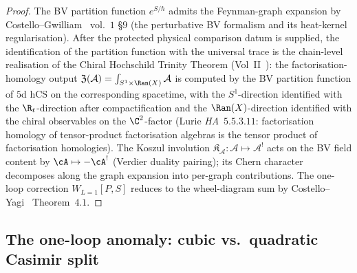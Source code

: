 \begin{proof}
The BV partition function $e^{S/\hbar}$ admits the Feynman-graph
expansion by Costello--Gwilliam~\cite{CostelloGwilliam} vol.~$1$ \S$9$
\textup{(}the perturbative BV formalism and its heat-kernel
regularisation\textup{).}
After the protected physical comparison datum is supplied, the
identification of the partition function with the universal trace is the
chain-level realisation of the Chiral Hochschild Trinity Theorem
\textup{(}Vol~II~\cite{VolII}\textup{):} the
factorisation-homology output
$\mathfrak{Z}(\mathcal{A}) = \int_{S^1\times\Ran(X)}\mathcal{A}$ is
computed by the BV partition function of $5$d hCS on the corresponding
spacetime, with the $S^1$-direction identified with the
$\R_t$-direction after compactification and the $\Ran(X)$-direction
identified with the chiral observables on the $\C^2$-factor (Lurie
\emph{HA}~$5.5.3.11$: factorisation homology of tensor-product
factorisation algebras is the tensor product of factorisation
homologies). The Koszul involution
$\mathfrak{K}_{\mathcal{A}} : \mathcal{A}\mapsto\mathcal{A}^!$ acts on
the BV field content by $\cA\mapsto -\cA^!$ (Verdier duality pairing);
its Chern character decomposes along the graph expansion into
per-graph contributions. The one-loop correction
$W_{L=1}[P, S]$ reduces to the wheel-diagram sum by
Costello--Yagi~\cite{CostelloYagi2018} Theorem~$4.1$.
\end{proof}

\subsection{The one-loop anomaly: cubic vs.\ quadratic Casimir split}
\label{subsec:phiutp-one-loop-anomaly-split}

